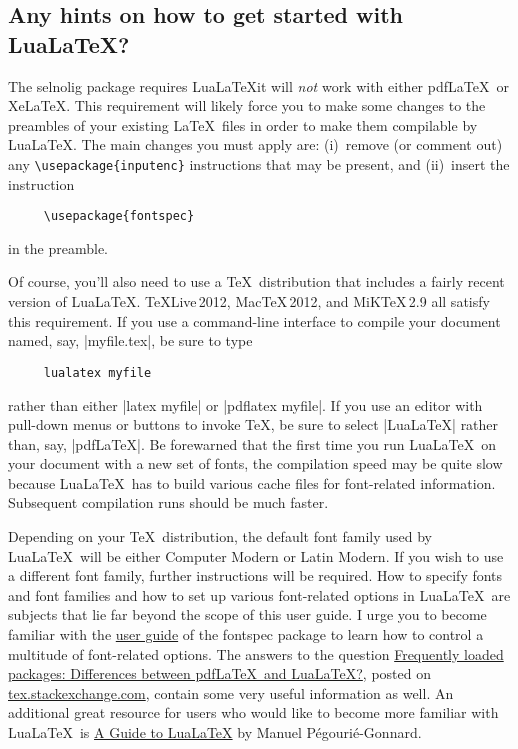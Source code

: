 \documentclass[12pt]{article}
\newcommand{\pkg}[1]{\textsf{#1}}
\begin{document}
\subsection{Any hints on how to get started with Lua\LaTeX?}

The \pkg{selnolig} package requires Lua\LaTeX\textemdash it will \emph{not} work with either pdf\LaTeX\ or Xe\LaTeX. This requirement will likely force you to make some changes to the preambles of your existing \LaTeX\ files in order to make them compilable by Lua\LaTeX. The main changes you must apply are: (i)~remove (or comment out) any \Verb+\usepackage{inputenc}+ instructions that may be present, and (ii)~insert the instruction
\begin{Verbatim}
     \usepackage{fontspec}
\end{Verbatim}
in the preamble.

Of course, you'll also need to use a \TeX\ distribution that includes a fairly recent version of Lua\LaTeX. \TeX Live\,2012, Mac\TeX\,2012, and MiK\TeX\,2.9 all satisfy this requirement. If you use a command-line interface to compile your document named, say, |myfile.tex|, be sure to type 
\begin{Verbatim}
     lualatex myfile
\end{Verbatim}
rather than either |latex myfile| or |pdflatex myfile|. If you use an editor with pull-down menus or buttons to invoke \TeX, be sure to select |LuaLaTeX| rather than, say, |pdfLaTeX|.
Be forewarned that the first time you run Lua\LaTeX\ on your document with a new set of fonts, the compilation speed may be quite slow because Lua\LaTeX\ has to build various cache files for font-related information. Subsequent compilation runs should be much faster. 

Depending on your \TeX\ distribution, the default font family used by Lua\LaTeX\ will be either Computer Modern or Latin Modern. If you wish to use a different font family, further instructions will be required. How to specify fonts and font families and how to set up various font-related options in Lua\LaTeX\ are subjects that lie far beyond the scope of this user guide. I urge you to become familiar with the \href{http://www.ctan.org/tex-archive/macros/latex/contrib/fontspec/fontspec.pdf}{user guide} of the \pkg{fontspec} package to learn how to control a multitude of font-related options. The answers to the question \href{http://tex.stackexchange.com/q/28642/5001}{Frequently loaded packages: Differences between pdf\LaTeX\ and Lua\LaTeX?}, posted on \href{http://tex.stackexchange.com/}{tex.s\breaklig tackexchange.com}, contain some very useful information as well. An additional great resource for users who would like to become more familiar with Lua\LaTeX\ is  \href{http://mirror.ctan.org/info/luatex/lualatex-doc/lualatex-doc.pdf}{A Guide to Lua\LaTeX} by Manuel Pégourié-Gonnard.
\end{document}
